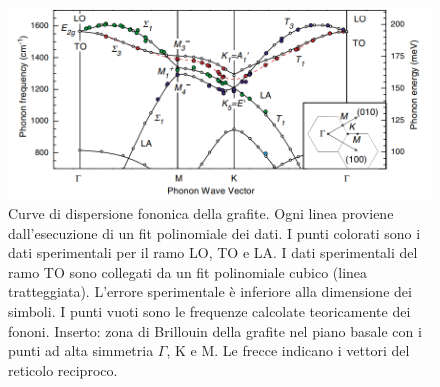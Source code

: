 \documentclass[a4paper,titlepage]{book}
\begin{document}
\begin{figure}[h!] 
	\centering
	\includegraphics[width=1\columnwidth]{fononegrafite.png}
	\caption{ 	
		Curve di dispersione fononica della grafite. Ogni linea proviene dall'esecuzione di un fit polinomiale dei dati. I punti colorati sono i dati sperimentali per il ramo LO, TO e LA. I dati sperimentali del ramo TO sono collegati da un fit polinomiale cubico (linea tratteggiata). L'errore sperimentale è inferiore alla dimensione dei simboli. I punti vuoti sono le frequenze calcolate teoricamente dei fononi. Inserto: zona di Brillouin della grafite nel piano basale con i punti ad alta simmetria $\Gamma$, K e M. Le frecce indicano i vettori del reticolo reciproco.
	} \label{phonon}
\end{figure}
\end{document}
